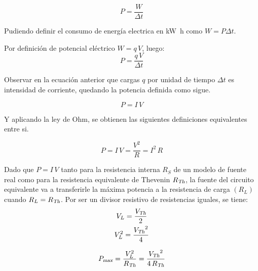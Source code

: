 \begin{mdframed}[style=DefinitionFrame]
    \begin{defn}
    \end{defn}
    \begin{equation*}
        P = \frac{W}{\Delta t}
    \end{equation*}
\end{mdframed}

Pudiendo definir el consumo de energía electrica en \si{\kilo\watt\hour} como $W = P \Delta t$.

Por definición de potencial eléctrico $W = q \, V$, luego:
\begin{equation*}
    P = \frac{q \, V}{\Delta t}
\end{equation*}

Observar en la ecuación anterior que cargas $q$ por unidad de tiempo $\Delta t$ es intensidad de corriente, quedando la potencia definida como sigue.

\begin{mdframed}[style=DefinitionFrame]
    \begin{defn}
    \end{defn}
    \begin{equation*}
        P = I \, V
    \end{equation*}
\end{mdframed}

Y aplicando la ley de Ohm, se obtienen las siguientes definiciones equivalentes entre si.

\begin{mdframed}[style=PropertyFrame]
    \begin{prop}
    \end{prop}
    \begin{equation*}
        P = I \, V = \frac{V^2}{R} = I^2 \, R
    \end{equation*}
\end{mdframed}

Dado que $P = I \, V$ tanto para la resistencia interna $R_S$ de un modelo de fuente real como para la resistencia equivalente de Thevenin ${{R}_\textsl{{Th}}}$, la fuente del circuito equivalente va a transferirle la máxima potencia a la resistencia de carga $(R_L)$ cuando $R_L={{R}_\textsl{{Th}}}$.
Por ser un divisor resistivo de resistencias iguales, se tiene:
\begin{gather*}
    V_L = \frac{{{V}_\textsl{{Th}}}}{2}
    \\
    V_L^2 = \frac{{{V}_\textsl{{Th}}}^2}{4}
\end{gather*}

\begin{mdframed}[style=PropertyFrame]
    \begin{prop}
    \end{prop}
    \begin{equation*}
        {{P}_\textsl{{max}}} = \frac{V_L^2}{{{R}_\textsl{{Th}}}} = \frac{{{V}_\textsl{{Th}}}^2}{4 \, {{R}_\textsl{{Th}}}}
    \end{equation*}
\end{mdframed}